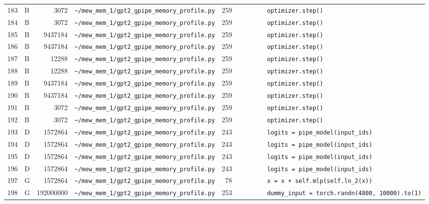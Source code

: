 \documentclass{article}
\begin{document}
\begin{longtable}{r l r p{6.5cm} r p{7.0cm}}
183 & B & 3072 & \lstinline|~/mew_mem_1/gpt2_gpipe_memory_profile.py| & 259 & \lstinline|        optimizer.step()| \\
184 & B & 3072 & \lstinline|~/mew_mem_1/gpt2_gpipe_memory_profile.py| & 259 & \lstinline|        optimizer.step()| \\
185 & B & 9437184 & \lstinline|~/mew_mem_1/gpt2_gpipe_memory_profile.py| & 259 & \lstinline|        optimizer.step()| \\
186 & B & 9437184 & \lstinline|~/mew_mem_1/gpt2_gpipe_memory_profile.py| & 259 & \lstinline|        optimizer.step()| \\
187 & B & 12288 & \lstinline|~/mew_mem_1/gpt2_gpipe_memory_profile.py| & 259 & \lstinline|        optimizer.step()| \\
188 & B & 12288 & \lstinline|~/mew_mem_1/gpt2_gpipe_memory_profile.py| & 259 & \lstinline|        optimizer.step()| \\
189 & B & 9437184 & \lstinline|~/mew_mem_1/gpt2_gpipe_memory_profile.py| & 259 & \lstinline|        optimizer.step()| \\
190 & B & 9437184 & \lstinline|~/mew_mem_1/gpt2_gpipe_memory_profile.py| & 259 & \lstinline|        optimizer.step()| \\
191 & B & 3072 & \lstinline|~/mew_mem_1/gpt2_gpipe_memory_profile.py| & 259 & \lstinline|        optimizer.step()| \\
192 & B & 3072 & \lstinline|~/mew_mem_1/gpt2_gpipe_memory_profile.py| & 259 & \lstinline|        optimizer.step()| \\
193 & D & 1572864 & \lstinline|~/mew_mem_1/gpt2_gpipe_memory_profile.py| & 243 & \lstinline|        logits = pipe_model(input_ids)| \\
194 & D & 1572864 & \lstinline|~/mew_mem_1/gpt2_gpipe_memory_profile.py| & 243 & \lstinline|        logits = pipe_model(input_ids)| \\
195 & D & 1572864 & \lstinline|~/mew_mem_1/gpt2_gpipe_memory_profile.py| & 243 & \lstinline|        logits = pipe_model(input_ids)| \\
196 & D & 1572864 & \lstinline|~/mew_mem_1/gpt2_gpipe_memory_profile.py| & 243 & \lstinline|        logits = pipe_model(input_ids)| \\
197 & G & 1572864 & \lstinline|~/mew_mem_1/gpt2_gpipe_memory_profile.py| & 78 & \lstinline|        x = x + self.mlp(self.ln_2(x))| \\
198 & G & 192000000 & \lstinline|~/mew_mem_1/gpt2_gpipe_memory_profile.py| & 253 & \lstinline|        dummy_input = torch.randn(4800, 10000).to(1)| \\
\end{longtable}
\end{document}
